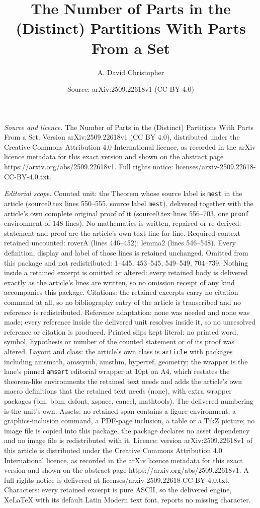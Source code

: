 \documentclass[10pt,a4paper]{amsart}
\title[The Number of Parts in the (Distinct) Partitions With Parts ]{The Number of Parts in the (Distinct) Partitions With Parts From a Set}
\author{A. David Christopher}
\date{Source: arXiv:2509.22618v1 (CC BY 4.0)}
\begin{document}
\maketitle

\noindent\emph{Source and licence.} The Number of Parts in the (Distinct) Partitions With Parts From a Set. Version arXiv:2509.22618v1 (CC BY 4.0), distributed under the Creative Commons Attribution 4.0 International licence, as recorded in the arXiv licence metadata for this exact version and shown on the abstract page https://arxiv.org/abs/2509.22618v1. Full rights notice: licenses/arxiv-2509.22618-CC-BY-4.0.txt.\par\smallskip

\noindent\textit{Editorial scope.} Counted unit: the Theorem whose source label is \texttt{mest} in the article (source0.tex lines 550--555, source label \texttt{mest}), delivered together with the article's own complete original proof of it (source0.tex lines 556--703, one \texttt{proof} environment of 148 lines). No mathematics is written, repaired or re-derived: statement and proof are the article's own text line for line. Required context retained uncounted: roverA (lines 446--452); lemma2 (lines 546--548). Every definition, display and label of those lines is retained unchanged. Omitted from this package and not redistributed: 1--445, 453--545, 549--549, 704--739. Nothing inside a retained excerpt is omitted or altered: every retained body is delivered exactly as the article's lines are written, so no omission receipt of any kind accompanies this package. Citations: the retained excerpts carry no citation command at all, so no bibliography entry of the article is transcribed and no reference is redistributed. Reference adaptation: none was needed and none was made; every reference inside the delivered unit resolves inside it, so no unresolved reference or citation is produced. Printed slips kept literal: no printed word, symbol, hypothesis or number of the counted statement or of its proof was altered. Layout and class: the article's own class is \texttt{article} with packages including amsmath, amssymb, amsthm, hyperref, geometry; the wrapper is the lane's pinned \texttt{amsart} editorial wrapper at 10pt on A4, which restates the theorem-like environments the retained text needs and adds the article's own macro definitions that the retained text needs (none), with extra wrapper packages (bm, bbm, dsfont, xspace, cancel, mathtools). The delivered numbering is the unit's own. Assets: no retained span contains a figure environment, a graphics-inclusion command, a PDF-page inclusion, a table or a TikZ picture; no image file is copied into this package, the package declares no asset dependency and no image file is redistributed with it. Licence: version arXiv:2509.22618v1 of this article is distributed under the Creative Commons Attribution 4.0 International licence, as recorded in the arXiv licence metadata for this exact version and shown on the abstract page https://arxiv.org/abs/2509.22618v1. A full rights notice is delivered at licenses/arxiv-2509.22618-CC-BY-4.0.txt. Characters: every retained excerpt is pure ASCII, so the delivered engine, XeLaTeX with its default Latin Modern text font, reports no missing character.
\end{document}
